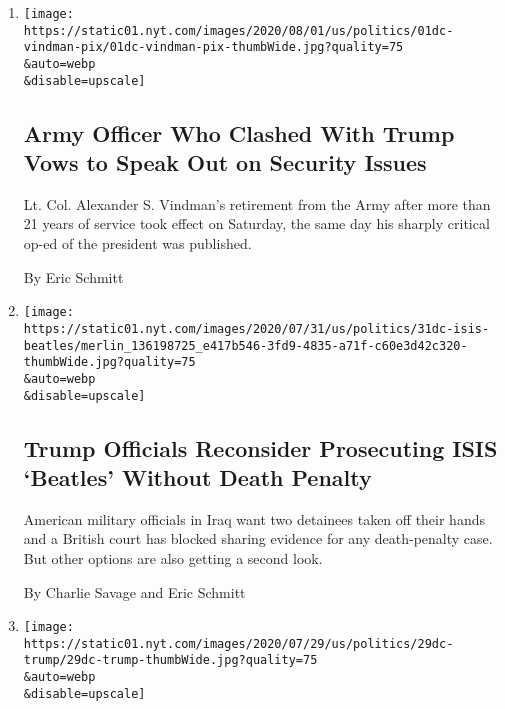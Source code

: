 \begin{enumerate}
\def\labelenumi{\arabic{enumi}.}
\item
  \href{/2020/08/01/us/politics/alexander-vindman-impeachment-trump.html}{}

  \texttt{[image: https://static01.nyt.com/images/2020/08/01/us/politics/01dc-vindman-pix/01dc-vindman-pix-thumbWide.jpg?quality=75\\\&auto=webp\\\&disable=upscale]}

  \hypertarget{army-officer-who-clashed-with-trump-vows-to-speak-out-on-security-issues}{%
  \subsection{Army Officer Who Clashed With Trump Vows to Speak Out on
  Security
  Issues}\label{army-officer-who-clashed-with-trump-vows-to-speak-out-on-security-issues}}

  Lt. Col. Alexander S. Vindman's retirement from the Army after more
  than 21 years of service took effect on Saturday, the same day his
  sharply critical op-ed of the president was published.

  By Eric Schmitt
\item
  \href{/2020/07/31/world/middleeast/isis-beatles-hostages.html}{}

  \texttt{[image: https://static01.nyt.com/images/2020/07/31/us/politics/31dc-isis-beatles/merlin\_136198725\_e417b546-3fd9-4835-a71f-c60e3d42c320-thumbWide.jpg?quality=75\\\&auto=webp\\\&disable=upscale]}

  \hypertarget{trump-officials-reconsider-prosecuting-isis-beatles-without-death-penalty}{%
  \subsection{Trump Officials Reconsider Prosecuting ISIS `Beatles'
  Without Death
  Penalty}\label{trump-officials-reconsider-prosecuting-isis-beatles-without-death-penalty}}

  American military officials in Iraq want two detainees taken off their
  hands and a British court has blocked sharing evidence for any
  death-penalty case. But other options are also getting a second look.

  By Charlie Savage and Eric Schmitt
\item
  \href{/2020/07/29/us/politics/trump-putin-bounties.html}{}

  \texttt{[image: https://static01.nyt.com/images/2020/07/29/us/politics/29dc-trump/29dc-trump-thumbWide.jpg?quality=75\\\&auto=webp\\\&disable=upscale]}


\end{enumerate}
